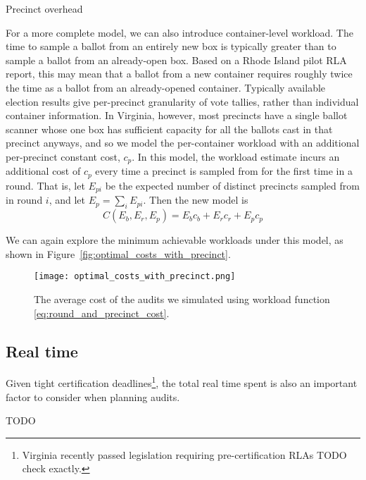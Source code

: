 Precinct overhead

For a more complete model, we can also introduce container-level workload. The time to sample a ballot from an entirely new box is typically greater than to sample a ballot from an already-open box. Based on a Rhode Island pilot RLA report\cite{RI-report}, this may mean that a ballot from a new container requires roughly twice the time as a ballot from an already-opened container. Typically available election results give per-precinct granularity of vote tallies, rather than individual container information. In Virginia, however, most precincts have a single ballot scanner whose one box has sufficient capacity for all the ballots cast in that precinct anyways, and so we model the per-container workload with an additional per-precinct constant cost, $c_p$. In this model, the workload estimate incurs an additional cost of $c_p$ every time a precinct is sampled from for the first time in a round. That is, let $E_{pi}$ be the expected number of distinct precincts sampled from in round $i$, and let $E_p=\sum_i E_{pi}$. Then the new model is
\begin{equation}
C(E_b, E_r, E_p) = E_b c_b + E_r c_r + E_p c_p
\label{eq:round_and_precinct_cost}
\end{equation}

We can again explore the minimum achievable workloads under this model, as shown in Figure~\ref{fig:optimal_costs_with_precinct}.

\begin{figure}
\texttt{[image: optimal\_costs\_with\_precinct.png]}
\caption{The average cost of the audits we simulated using workload function \ref{eq:round_and_precinct_cost}.}
\label{fig:optimal_ps}
\end{figure}


\subsection{Real time}
Given tight certification deadlines\footnote{Virginia recently passed legislation requiring pre-certification RLAs TODO check exactly.}, the total real time spent is also an important factor to consider when planning audits.

TODO





